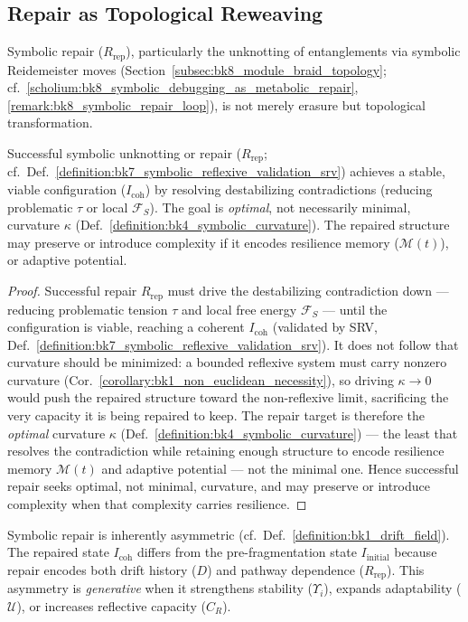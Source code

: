 \subsection{Repair as Topological Reweaving}
\label{subsec:bk9_repair_as_topological_reweaving}
Symbolic repair ($R_{\text{rep}}$), particularly the unknotting of entanglements via symbolic Reidemeister moves (Section~\ref{subsec:bk8_module_braid_topology}; cf.~\ref{scholium:bk8_symbolic_debugging_as_metabolic_repair}, \ref{remark:bk8_symbolic_repair_loop}), is not merely erasure but topological transformation.
\begin{proposition}
\label{proposition:bk9_curvature_resilience_bound}
Successful symbolic unknotting or repair ($R_{\text{rep}}$; cf.~Def.~\ref{definition:bk7_symbolic_reflexive_validation_srv}) achieves a stable, viable configuration ($I_{\text{coh}}$) by resolving destabilizing contradictions (reducing problematic $\tau$ or local $\mathcal{F}_S$). The goal is \emph{optimal}, not necessarily minimal, curvature $\kappa$ (Def.~\ref{definition:bk4_symbolic_curvature}). The repaired structure may preserve or introduce complexity if it encodes resilience
memory ($\mathcal{M}(t)$), or adaptive potential.
\end{proposition}
\begin{proof}
\label{proof:bk9_curvature_resilience_bound}
\leavevmode
Successful repair $R_{\text{rep}}$ must drive the destabilizing contradiction down --- reducing problematic tension $\tau$ and local free energy $\mathcal{F}_S$ --- until the configuration is viable, reaching a coherent $I_{\text{coh}}$ (validated by SRV, Def.~\ref{definition:bk7_symbolic_reflexive_validation_srv}). It does not follow that curvature should be minimized: a bounded reflexive system must carry nonzero curvature (Cor.~\ref{corollary:bk1_non_euclidean_necessity}), so driving $\kappa\to0$ would push the repaired structure toward the non-reflexive limit, sacrificing the very capacity it is being repaired to keep. The repair target is therefore the \emph{optimal} curvature $\kappa$ (Def.~\ref{definition:bk4_symbolic_curvature}) --- the least that resolves the contradiction while retaining enough structure to encode resilience memory $\mathcal{M}(t)$ and adaptive potential --- not the minimal one. Hence successful repair seeks optimal, not minimal, curvature, and may preserve or introduce complexity when that complexity carries resilience.
\end{proof}
\begin{definition}
\label{definition:bk9_generative_asymmetry}
\leavevmode\newline
Symbolic repair is inherently asymmetric (cf.~Def.~\ref{definition:bk1_drift_field}).
The repaired state $I_{\text{coh}}$ differs from the pre-fragmentation state $I_{\text{initial}}$ because repair encodes both drift history ($D$) and pathway dependence ($R_{\text{rep}}$).
This asymmetry is \emph{generative} when it strengthens stability ($\Upsilon_i$), expands adaptability ($\mathcal{U}$), or increases reflective capacity ($C_R$).
\end{definition}
